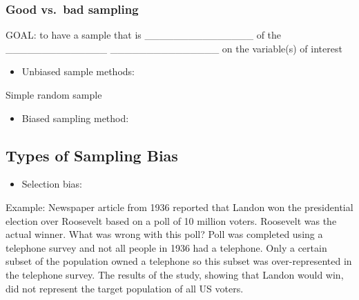 \documentclass[
]{report}
\providecommand{\tightlist}{%
  \setlength{\itemsep}{0pt}\setlength{\parskip}{0pt}}
\newcommand{\rgi}{\hspace{24pt}}  %
\begin{document}
\vspace{0.2in}

\hypertarget{good-vs.-bad-sampling}{%
\subsubsection*{Good vs.~bad sampling}\label{good-vs.-bad-sampling}}


GOAL: to have a sample that is \_\_\_\_\_\_\_\_\_\_\_\_\_\_\_ of the
\_\_\_\_\_\_\_\_\_\_\_\_\_\_ \_\_\_\_\_\_\_\_\_\_\_\_\_\_\_ on the variable(s) of interest


\begin{itemize}
\tightlist
\item
  Unbiased sample methods:
\end{itemize}

\vspace{0.5in}

\rgi \rgi Simple random sample

\begin{itemize}
\tightlist
\item
  Biased sampling method:
\end{itemize}

\vspace{0.5in}

\hypertarget{types-of-sampling-bias}{%
\subsection*{Types of Sampling Bias}\label{types-of-sampling-bias}}

\begin{itemize}
\tightlist
\item
  Selection bias:
\end{itemize}

\vspace{0.5in}

\newpage

Example: Newspaper article from 1936 reported that Landon won the presidential election over Roosevelt based on a poll of 10 million voters. Roosevelt was the actual winner. What was wrong with this poll? Poll was completed using a telephone survey and not all people in 1936 had a telephone. Only a certain subset of the population owned a telephone so this subset was over-represented in the telephone survey. The results of the study, showing that Landon would win, did not represent the target population of all US voters.
\end{document}
